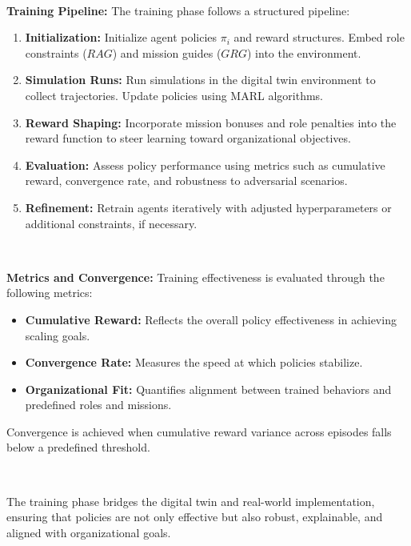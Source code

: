 \documentclass[conference]{IEEEtran}
\begin{document}
\

\noindent\textbf{Training Pipeline:} 
The training phase follows a structured pipeline:
\begin{enumerate}
    \item \textbf{Initialization:} Initialize agent policies $\pi_i$ and reward structures. Embed role constraints ($RAG$) and mission guides ($GRG$) into the environment.
    \item \textbf{Simulation Runs:} Run simulations in the digital twin environment to collect trajectories. Update policies using MARL algorithms.
    \item \textbf{Reward Shaping:} Incorporate mission bonuses and role penalties into the reward function to steer learning toward organizational objectives.
    \item \textbf{Evaluation:} Assess policy performance using metrics such as cumulative reward, convergence rate, and robustness to adversarial scenarios.
    \item \textbf{Refinement:} Retrain agents iteratively with adjusted hyperparameters or additional constraints, if necessary.
\end{enumerate}

\

\noindent\textbf{Metrics and Convergence:} 
Training effectiveness is evaluated through the following metrics:
\begin{itemize}
    \item \textbf{Cumulative Reward:} Reflects the overall policy effectiveness in achieving scaling goals.
    \item \textbf{Convergence Rate:} Measures the speed at which policies stabilize.
    \item \textbf{Organizational Fit:} Quantifies alignment between trained behaviors and predefined roles and missions.
\end{itemize}
Convergence is achieved when cumulative reward variance across episodes falls below a predefined threshold.

\

The training phase bridges the digital twin and real-world implementation, ensuring that policies are not only effective but also robust, explainable, and aligned with organizational goals.

\end{document}
